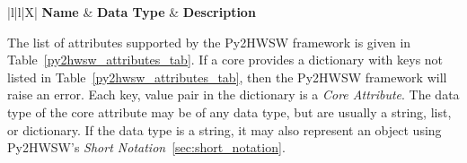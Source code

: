 %
%

\begin{xltabular}{\textwidth}{|l|l|X|}
  \hline
  {\bf Name} & {\bf Data Type} & {\bf Description}  \\ \hline \hline
  \endhead

  

  \caption{Table of supported Py2HWSW attributes in the \textbf{Core Dictionary}. The \textit{Data Type} column specifies the type of internal object that the Py2HWSW will convert the attribute's value to (usually the user inputs a string, list, or dictionary value and then py2 converts it to an internal object).}
  \label{py2hwsw_attributes_tab}
\end{xltabular}

The list of attributes supported by the Py2HWSW framework is given in Table~\ref{py2hwsw_attributes_tab}.
If a core provides a dictionary with keys not listed in Table~\ref{py2hwsw_attributes_tab}, then the Py2HWSW framework will raise an error.
Each key, value pair in the dictionary is a \textit{Core Attribute}.
The data type of the core attribute may be of any data type, but are usually a string, list, or dictionary.
If the data type is a string, it may also represent an object using Py2HWSW's \textit{Short Notation}~\ref{sec:short_notation}.
